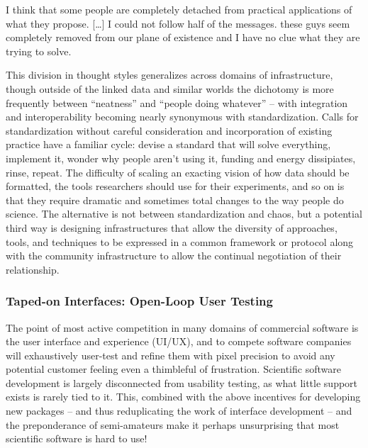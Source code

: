\documentclass[10pt]{article}
\begin{document}
\begin{multicols}{2}
\begin{leftbar}
I think that some people are completely detached from practical
applications of what they propose. {[}\ldots{]} I could not follow half
of the messages. these guys seem completely removed from our plane of
existence and I have no clue what they are trying to solve.
\end{leftbar}

This division in thought styles generalizes across domains of
infrastructure, though outside of the linked data and similar worlds the
dichotomy is more frequently between ``neatness'' and ``people doing
whatever'' -- with integration and interoperability becoming nearly
synonymous with standardization. Calls for standardization without
careful consideration and incorporation of existing practice have a
familiar cycle: devise a standard that will solve everything, implement
it, wonder why people aren't using it, funding and energy dissipiates,
rinse, repeat. The difficulty of scaling an exacting vision of how data
should be formatted, the tools researchers should use for their
experiments, and so on is that they require dramatic and sometimes total
changes to the way people do science. The alternative is not between
standardization and chaos, but a potential third way is designing
infrastructures that allow the diversity of approaches, tools, and
techniques to be expressed in a common framework or protocol along with
the community infrastructure to allow the continual negotiation of their
relationship.

\hypertarget{taped-on-interfaces-open-loop-user-testing}{%
\subsubsection{Taped-on Interfaces: Open-Loop User
Testing}\label{taped-on-interfaces-open-loop-user-testing}}

The point of most active competition in many domains of commercial
software is the user interface and experience (UI/UX), and to compete
software companies will exhaustively user-test and refine them with
pixel precision to avoid any potential customer feeling even a
thimbleful of frustration. Scientific software development is largely
disconnected from usability testing, as what little support exists is
rarely tied to it. This, combined with the above incentives for
developing new packages -- and thus reduplicating the work of interface
development -- and the preponderance of semi-amateurs make it perhaps
unsurprising that most scientific software is hard to use!


\end{multicols}
\end{document}
